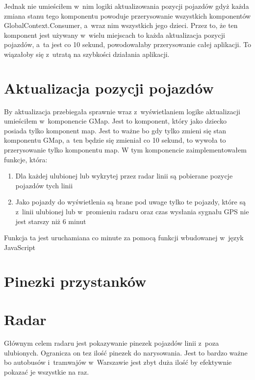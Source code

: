 \documentclass{SGGW-thesis}
\begin{document}
Jednak nie umieściłem w~nim logiki aktualizowania pozycji pojazdów gdyż każda zmiana stanu
tego komponentu powoduje przerysowanie wszystkich komponentów GlobalContext.Consumer, a~wraz nim wszystkich jego dzieci.
Przez to, że ten komponent jest używany w~wielu miejscach to każda aktualizacja pozycji pojazdów, a~ta
jest co 10 sekund, powodowałaby przerysowanie całej aplikacji. To wiązałoby się z~utratą na szybkości działania
aplikacji.

\section{Aktualizacja pozycji pojazdów}
By aktualizacja przebiegała sprawnie wraz z~wyświetlaniem logike aktualizacji umieściłem w~komponencie GMap.
Jest to komponent, który jako dziecko posiada tylko komponent map. Jest to ważne bo gdy tylko zmieni się stan
komponentu GMap, a~ten będzie się zmieniał co 10 sekund, to wywoła to przerysowanie tylko komponentu map.
W tym komponencie zaimplementowałem funkcje, która:
\begin{enumerate}
  \item{Dla każdej ulubionej lub wykrytej przez radar linii są pobierane pozycje pojazdów tych linii}
  \item{Jako pojazdy do wyświetlenia są brane pod uwage tylko te pojazdy, które są z~linii ulubionej lub w~promieniu radaru oraz czas wysłania sygnału GPS nie jest starszy niż 6 minut}
\end{enumerate}
Funkcja ta jest uruchamiana co minute za pomocą funkcji  wbudowanej w~język JavaScript

\section{Pinezki przystanków}
\section{Radar}
Głównym celem radaru jest pokazywanie pinezek pojazdów linii z~poza ulubionych. Ogranicza on tez ilość
pinezek do narysowania. Jest to bardzo ważne bo autobusów i~tramwajów w~Warszawie jest zbyt duża
ilość by efektywnie pokazać je wszystkie na raz.
\end{document}
